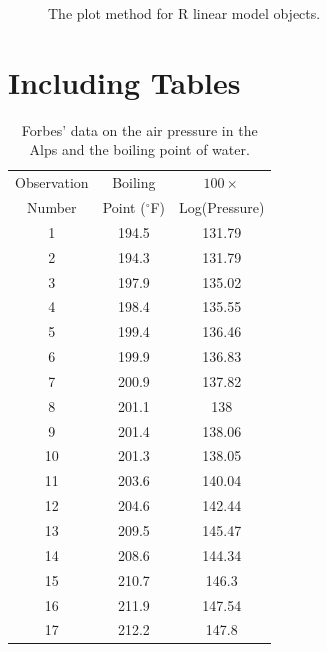 \documentclass[12pt]{article}
\begin{document}
\begin{figure}[h]
{}
\caption{The plot method for R linear model objects.\label{fig:lmplots}}
\end{figure}



\newpage
\section{Including Tables}

\begin{table}[h]
\begin{center}
\caption{Forbes' data on the air pressure in the Alps and the boiling point of water.\label{tab:forbes}}
\vspace{1em}
\begin{tabular}{ccc} \hline
Observation & Boiling & $100 \times$ \\
Number & Point ($^{\circ}$F) & Log(Pressure) \\ \hline
1 & 194.5 & 131.79 \\
2 & 194.3 & 131.79 \\
3 & 197.9 & 135.02 \\
4 & 198.4 & 135.55 \\
5 & 199.4 & 136.46 \\
6 & 199.9 & 136.83 \\
7 & 200.9 & 137.82 \\
8 & 201.1 & 138 \\
9 & 201.4 & 138.06 \\
10 & 201.3 & 138.05 \\
11 & 203.6 & 140.04 \\
12 & 204.6 & 142.44 \\
13 & 209.5 & 145.47 \\
14 & 208.6 & 144.34 \\
15 & 210.7 & 146.3 \\
16 & 211.9 & 147.54 \\
17 & 212.2 & 147.8 \\ \hline
\end{tabular}
\end{center}
\end{table}
\end{document}
